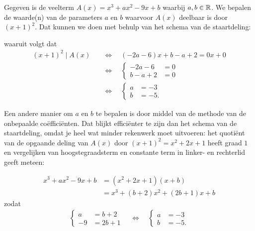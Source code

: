 \documentclass{ximera}
\begin{document}
\begin{example} 
Gegeven is de veelterm \(A(x) = x^3 + ax^2 - 9x + b\) waarbij \(a,b \in \mathbb{R}\). We bepalen de waarde(n) van de parameters \(a\) en \(b\) waarvoor \(A(x)\) deelbaar is door \((x+1)^2\). Dat kunnen we doen met behulp van het schema van de staartdeling:

waaruit volgt dat  
\begin{align*}
(x+1)^2 \mid A(x) \quad 
& \Leftrightarrow \quad (-2a-6)x+b-a+2 = 0x + 0 \\
& \Leftrightarrow \quad
\left\{ 
\begin{aligned}
-2a-6 & = 0 \\
b-a+2 & = 0 
\end{aligned}
\right. \\ 
& \Leftrightarrow \quad
\left\{ 
\begin{aligned}
a & = -3 \\
b & = -5. 
\end{aligned}
\right.
\end{align*} 

Een andere manier om \(a\) en \(b\) te bepalen is door middel van de methode van de onbepaalde coëfficiënten. Dat blijkt efficiënter te zijn dan het schema van de staartdeling, omdat je heel wat minder rekenwerk moet uitvoeren: het quotiënt van de opgaande deling van \(A(x)\) door \((x+1)^2 = x^2 + 2x + 1\) heeft graad \(1\) en vergelijken van hoogstegraadsterm en constante term in linker- en rechterlid geeft meteen:

\begin{align*}
x^3 + ax^2 - 9x + b 
& = (x^2 + 2x + 1)(x + b) \\
& = x^3 + (b+2)x^2 + (2b+1)x + b
\end{align*}
zodat 
\begin{align*}
\left\{ 
\begin{aligned}
a & = b+2 \\
-9 & = 2b+1
\end{aligned}
\right. 
\quad \Leftrightarrow \quad
\left\{ 
\begin{aligned}
a & = -3 \\
b & = -5. 
\end{aligned}
\right.
\end{align*}
\end{example} 
	
\end{document}
